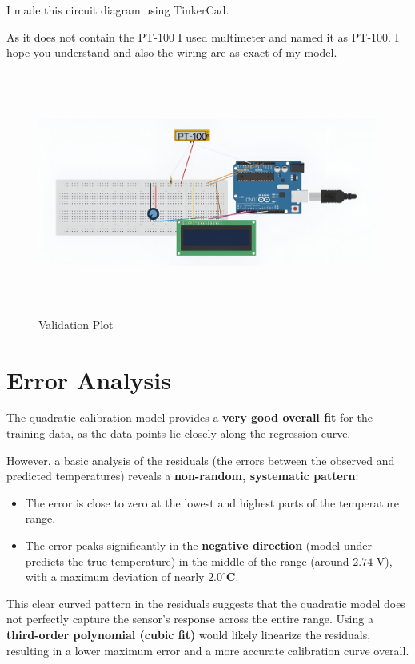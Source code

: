 \documentclass{article}
\begin{document}
I made this circuit diagram using TinkerCad.

As it does not contain the PT-100 I used multimeter and named it as PT-100. I hope you understand and also the wiring are as exact of my model.

\begin{figure}[H]
    \centering
    \includegraphics[width=1\textwidth,height=8cm]{figs/Circuit.png}
    \caption{Validation Plot}
    \label{fig:circuit}
\end{figure}


\section*{Error Analysis}

The quadratic calibration model provides a \textbf{very good overall fit} for the training data, as the data points lie closely along the regression curve.

However, a basic analysis of the residuals (the errors between the observed and predicted temperatures) reveals a \textbf{non-random, systematic pattern}:

\begin{itemize}
    \item The error is close to zero at the lowest and highest parts of the temperature range.
    \item The error peaks significantly in the \textbf{negative direction} (model under-predicts the true temperature) in the middle of the range (around $2.74\text{ V}$), with a maximum deviation of nearly $\mathbf{2.0^\circ\text{C}}$.
\end{itemize}

This clear curved pattern in the residuals suggests that the quadratic model does not perfectly capture the sensor's response across the entire range. Using a \textbf{third-order polynomial (cubic fit)} would likely linearize the residuals, resulting in a lower maximum error and a more accurate calibration curve overall.
\end{document}

